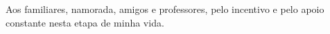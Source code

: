 \begin{agradecimentos}
	Aos familiares, namorada, amigos e professores, pelo incentivo e pelo apoio constante nesta etapa
	de minha vida.
\end{agradecimentos}